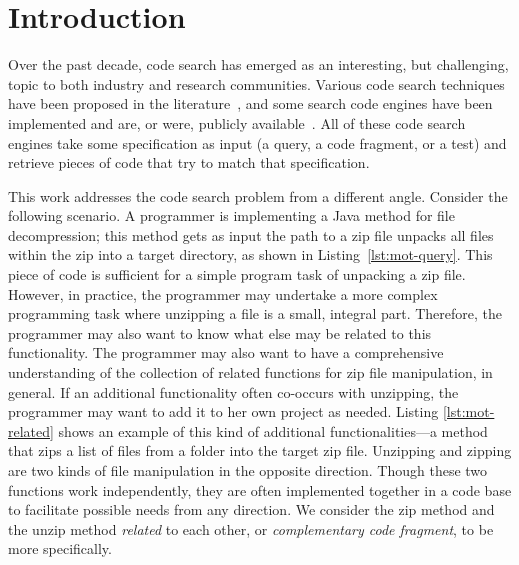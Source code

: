 \section{Introduction}
\label{sec:intro}
Over the past decade, code search has emerged as an interesting, but
challenging, topic to both industry and research communities. Various code search
techniques have been proposed in the
literature~\cite{bajracharya2009sourcerer,reiss2009semantics,lazzarini2009applying,mcmillan2012exemplar}, and
some search code engines have been implemented and are, or were, publicly
available~\cite{googlesearch, github,codase,krugle,ohloh,searchcode}. All
of these code search engines take some specification as input (a
query, a code fragment, or a test) and retrieve pieces of code that try
to match that specification.


This work addresses the code search problem from a different angle. Consider
the following scenario. A programmer is implementing a Java method for
file decompression; this method gets as input the path to a zip file
unpacks all files within the zip into a target directory, as shown in 
Listing~\ref{lst:mot-query}. This piece of code is sufficient for 
a simple program task of unpacking a zip file. However, in practice, the programmer 
may undertake a more complex programming task where unzipping a file is a small,
integral part. Therefore, the programmer may also want to know what else may be
related to this functionality. %
The programmer may also want to have a comprehensive understanding of the collection of related
functions for zip file manipulation, in general. If an additional
functionality often co-occurs with unzipping, the programmer may want to add it
to her own project as needed. Listing \ref{lst:mot-related} shows an example of this kind of additional 
functionalities---a method that zips a list of files from a folder into the target zip file. Unzipping
and zipping are two kinds of file manipulation in the opposite direction. 
Though these two functions work independently, they are often implemented together in a code base to facilitate
possible needs from any direction. We consider the zip method and the unzip method {\em related} to each other, or {\em complementary code fragment}, to be more specifically.

